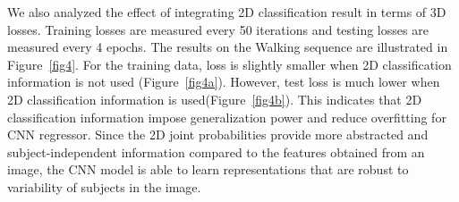\documentclass[runningheads]{llncs}
\begin{document}
We also analyzed the effect of integrating 2D classification result in terms of 3D losses. Training losses are measured every 50 iterations and testing losses are measured every 4 epochs. The results on the Walking sequence are illustrated in Figure~\ref{fig4}. For the training data, loss is slightly smaller when 2D classification information is not used (Figure~\ref{fig4a}). However, test loss is much lower when 2D classification information is used(Figure~\ref{fig4b}). This indicates that 2D classification information impose generalization power and reduce overfitting for CNN regressor. Since the 2D joint probabilities provide more abstracted and subject-independent information compared to the features obtained from an image, the CNN model is able to learn representations that are robust to variability of subjects in the image.
\end{document}
